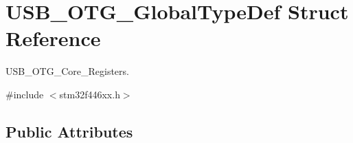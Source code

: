 \hypertarget{struct_u_s_b___o_t_g___global_type_def}{}\section{U\+S\+B\+\_\+\+O\+T\+G\+\_\+\+Global\+Type\+Def Struct Reference}
\label{struct_u_s_b___o_t_g___global_type_def}


U\+S\+B\+\_\+\+O\+T\+G\+\_\+\+Core\+\_\+\+Registers.  




{\ttfamily \#include $<$stm32f446xx.\+h$>$}

\subsection*{Public Attributes}
